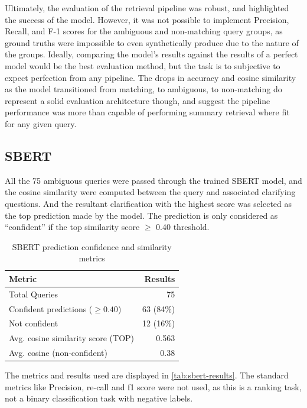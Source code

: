 \documentclass[11pt]{article}
\begin{document}
Ultimately, the evaluation of the retrieval pipeline was robust, and highlighted the success of the model. However, it was not possible to implement Precision, Recall, and F-1 scores for the ambiguous and non-matching query groups, as ground truths were impossible to even synthetically produce due to the nature of the groups. Ideally, comparing the model's results against the results of a perfect model would be the best evaluation method, but the task is to subjective to expect perfection from any pipeline. The drops in accuracy and cosine similarity as the model transitioned from matching, to ambiguous, to non-matching do represent a solid evaluation architecture though, and suggest the pipeline performance was more than capable of performing summary retrieval where fit for any given query.

\subsection{SBERT}
All the 75 ambiguous queries were passed through the trained SBERT model, and the cosine similarity were computed between the query and associated clarifying questions. And the resultant clarification with the highest score was selected as the top prediction made by the model. The prediction is only considered as “confident” if the top similarity score $\geq$ 0.40 threshold.

\begin{table}[h]
  \centering
  \begin{tabular}{l r}
  \hline
  \textbf{Metric} & \textbf{Results} \\
  \hline
  Total Queries & 75 \\
  Confident predictions ($\geq 0.40$) & 63 (84\%) \\
  Not confident & 12 (16\%) \\
  Avg. cosine similarity score (TOP) & 0.563 \\
  Avg. cosine (non-confident) & 0.38 \\
  \hline
  \end{tabular}
  \caption{SBERT prediction confidence and similarity metrics}
  \label{tab:sbert-results}
\end{table}
  
The metrics and results used are displayed in \autoref{tab:sbert-results}. The standard metrics like Precision, re-call and f1 score were not used, as this is a ranking task, not a binary classification task with negative labels.
\end{document}
